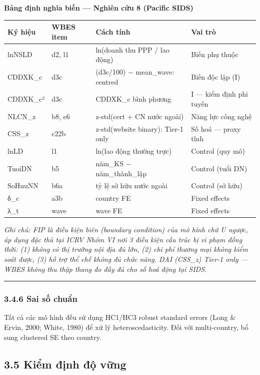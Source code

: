 \documentclass[12pt,a4paper]{article}
\begin{document}
\textbf{Bảng định nghĩa biến --- Nghiên cứu 8 (Pacific SIDS)}

\begin{longtable}[]{@{}llll@{}}
\toprule\noalign{}
Ký hiệu & WBES item & Cách tính & Vai trò \\
\midrule\noalign{}
\endhead
\bottomrule\noalign{}
\endlastfoot
lnNSLD & d2, l1 & ln(doanh thu PPP / lao động) & Biến phụ thuộc \\
CDDXK\_c & d3c & (d3c/100) − mean\_wave: centred & Biến độc lập (I) \\
CDDXK\_c² & d3c & CDDXK\_c bình phương & I --- kiểm định phi tuyến \\
NLCN\_z & b8, e6 & z-std(cert + CN nước ngoài) & Năng lực công nghệ \\
CSS\_z & c22b & z-std(website binary): Tier-1 only & Số hoá --- proxy
tĩnh \\
lnLD & l1 & ln(lao động thường trực) & Control (quy mô) \\
TuoiDN & b5 & năm\_KS − năm\_thành\_lập & Control (tuổi DN) \\
SoHuuNN & b6a & tỷ lệ sở hữu nước ngoài & Control (sở hữu) \\
δ\_c & a3b & country FE & Fixed effects \\
λ\_t & wave & wave FE & Fixed effects \\
\end{longtable}

\emph{Ghi chú: FIP là điều kiện biên (boundary condition) của mô hình
chữ U ngược, áp dụng đặc thù tại ICRV Nhóm VI nơi 3 điều kiện cấu trúc
bị vi phạm đồng thời: (1) không có thị trường nội địa đủ lớn, (2) chi
phí thương mại không kiểm soát được, (3) hỗ trợ thể chế không đủ chức
năng. DAI (CSS\_z) Tier-1 only --- WBES không thu thập thang đo đầy đủ
cho số hoá động tại SIDS.}

\begin{center}\rule{0.5\linewidth}{0.5pt}\end{center}

\hypertarget{346-sai-sux1ed1-chuux1ea9n}{%
\subsubsection{3.4.6 Sai số chuẩn}\label{346-sai-sux1ed1-chuux1ea9n}}

Tất cả các mô hình đều sử dụng HC1/HC3 robust standard errors (Long \&
Ervin, 2000; White, 1980) để xử lý heteroscedasticity. Đối với
multi-country, bổ sung clustered SE theo country.

\hypertarget{35-kiux1ec3m-ux111ux1ecbnh-ux111ux1ed9-vux1eefng}{%
\subsection{3.5 Kiểm định độ
vững}\label{35-kiux1ec3m-ux111ux1ecbnh-ux111ux1ed9-vux1eefng}}
\end{document}
